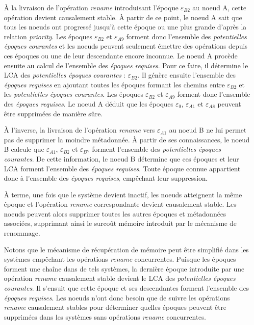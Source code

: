 \documentclass[12pt]{thesul}
\newcommand{\epoch}[1]{$\varepsilon_{#1}$}
\begin{document}
À la livraison de l'opération \emph{rename} introduisant l'époque \epoch{B2} au noeud A, cette opération devient causalement stable.
À partir de ce point, le noeud A sait que tous les noeuds ont progressé jusqu'à cette époque ou une plus grande d'après la relation \emph{priority}.
Les époques \epoch{B2} et \epoch{A9} forment donc l'ensemble des \emph{potentielles époques courantes} et les noeuds peuvent seulement émettre des opérations depuis ces époques ou une de leur descendante encore inconnue.
Le noeud A procède ensuite au calcul de l'ensemble des \emph{époques requises}.
Pour ce faire, il détermine le \ac{LCA} des \emph{potentielles époques courantes} : \epoch{B2}.
Il génère ensuite l'ensemble des \emph{époques requises} en ajoutant toutes les époques formant les chemins entre \epoch{B2} et les \emph{potentielles époques courantes}.
Les époques \epoch{B2} et \epoch{A9} forment donc l'ensemble des \emph{époques requises}.
Le noeud A déduit que les époques \epoch{0}, \epoch{A1} et \epoch{A8} peuvent être supprimées de manière sûre.

À l'inverse, la livraison de l'opération \emph{rename} vers \epoch{A1} au noeud B ne lui permet pas de supprimer la moindre métadonnée.
À partir de ses connaissances, le noeud B calcule que \epoch{A1}, \epoch{B2} et \epoch{B7} forment l'ensemble des \emph{potentielles époques courantes}.
De cette information, le noeud B détermine que ces époques et leur \ac{LCA} forment l'ensemble des \emph{époques requises}.
Toute époque connue appartient donc à l'ensemble des \emph{époques requises}, empêchant leur suppression.

À terme, une fois que le système devient inactif, les noeuds atteignent la même époque et l'opération \emph{rename} correspondante devient causalement stable.
Les noeuds peuvent alors supprimer toutes les autres époques et métadonnées associées, supprimant ainsi le surcoût mémoire introduit par le mécanisme de renommage.

Notons que le mécanisme de récupération de mémoire peut être simplifié dans les systèmes empêchant les opérations \emph{rename} concurrentes.
Puisque les époques forment une chaîne dans de tels systèmes, la dernière époque introduite par une opération \emph{rename} causalement stable devient le \ac{LCA} des \emph{potentielles époques courantes}.
Il s'ensuit que cette époque et ses descendantes forment l'ensemble des \emph{époques requises}.
Les noeuds n'ont donc besoin que de suivre les opérations \emph{rename} causalement stables pour déterminer quelles époques peuvent être supprimées dans les systèmes sans opérations \emph{rename} concurrentes.
\end{document}
